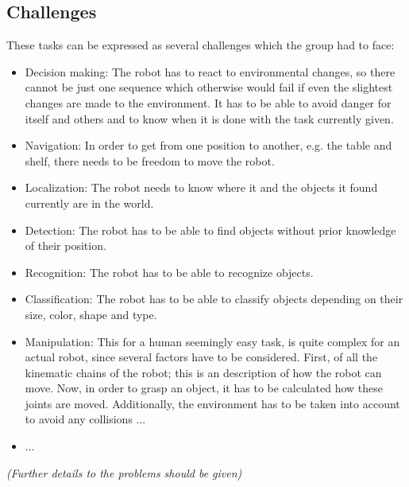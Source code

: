 \documentclass[main.tex]{subfiles}
\begin{document}
	\subsection{Challenges} 
	These tasks can be expressed as several challenges which the group had to face:
	\begin{itemize}
		\item Decision making: The robot has to react to environmental changes, so there cannot be just one sequence which otherwise would fail if even the slightest changes are made to the environment. It has to be able to avoid danger for itself and others and to know when it is done with the task currently given.
		\item Navigation: In order to get from one position to another, e.g. the table and shelf, there needs to be freedom to move the robot. 
		\item Localization: The robot needs to know where it and the objects it found currently are in the world.
		\item Detection: The robot has to be able to find objects without prior knowledge of their position.
		\item Recognition: The robot has to be able to recognize objects.
		\item Classification: The robot has to be able to classify objects depending on their size, color, shape and type.
		\item Manipulation: This for a human seemingly easy task, is quite complex for an actual robot, since several factors have to be considered. First, of all the kinematic chains of the robot; this is an description of how the robot can move. Now, in order to grasp an object, it has to be calculated how these joints are moved. Additionally, the environment has to be taken into account to avoid any collisions ...
		\item ...

	\end{itemize}
	
	\textit{(Further details to the problems should be given)}	
	
\end{document}
